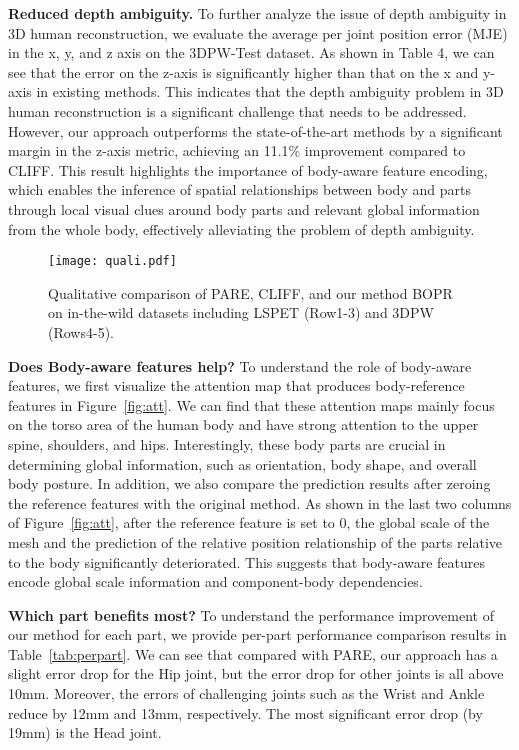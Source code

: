 \documentclass[10pt,twocolumn,letterpaper]{article}
\begin{document}
\noindent\textbf{Reduced depth ambiguity.}
To further analyze the issue of depth ambiguity in 3D human reconstruction, we evaluate the average per joint position error (MJE) in the x, y, and z axis on the 3DPW-Test dataset. As shown in Table 4, we can see that the error on the z-axis is significantly higher than that on the x and y-axis in existing methods. This indicates that the depth ambiguity problem in 3D human reconstruction is a significant challenge that needs to be addressed. However, our approach outperforms the state-of-the-art methods by a significant margin in the z-axis metric, achieving an 11.1\% improvement compared to CLIFF. This result highlights the importance of body-aware feature encoding, which enables the inference of spatial relationships between body and parts through local visual clues around body parts and relevant global information from the whole body, effectively alleviating the problem of depth ambiguity.


\begin{figure*}
  \centering
  \texttt{[image: quali.pdf]}
  \vspace{-1em}
  \caption{Qualitative comparison of PARE, CLIFF, and our method BOPR on in-the-wild datasets including LSPET (Row1-3) and 3DPW (Rows4-5).}\label{fig:qua}
\end{figure*}

\noindent\textbf{Does Body-aware features help?}
To understand the role of body-aware features, we first visualize the attention map that produces body-reference features in Figure~\ref{fig:att}. We can find that these attention maps mainly focus on the torso area of the human body and have strong attention to the upper spine, shoulders, and hips. Interestingly, these body parts are crucial in determining global information, such as orientation, body shape, and overall body posture. In addition, we also compare the prediction results after zeroing the reference features with the original method. As shown in the last two columns of Figure~\ref{fig:att}, after the reference feature is set to 0, the global scale of the mesh and the prediction of the relative position relationship of the parts relative to the body significantly deteriorated. This suggests that body-aware features encode global scale information and component-body dependencies.

\noindent\textbf{Which part benefits most?} To understand the performance improvement of our method for each part, we provide per-part performance comparison results in Table~\ref{tab:perpart}. We can see that compared with PARE, our approach has a slight error drop for the Hip joint, but the error drop for other joints is all above 10mm. Moreover, the errors of challenging joints such as the Wrist and Ankle reduce by 12mm and 13mm, respectively. The most significant error drop (by 19mm)  is the Head joint.
\end{document}
